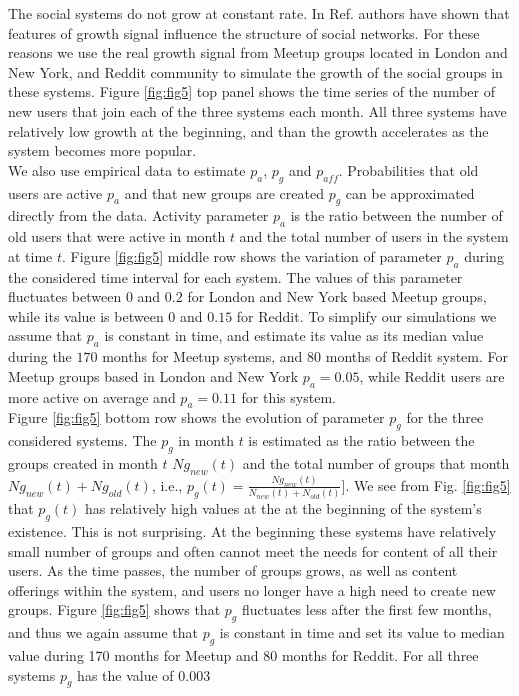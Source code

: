 The social systems do not grow at constant rate. In Ref. \cite{vranic2021growth} authors have shown that features of growth signal influence the  structure of social networks. For these reasons we use the real growth signal from Meetup groups located in London and New York, and Reddit community to simulate the growth of the social groups in these systems. Figure \ref{fig:fig5} top panel shows the time series of the number of new users that join each of the three systems each month. All three systems have relatively low growth at the beginning, and than the growth accelerates as the system becomes more popular.\\ 

We also use empirical data to estimate $p_{a}$, $p_{g}$ and $p_{aff}$. Probabilities that old users are active $p_a$ and that new groups are created $p_g$ can be approximated directly from the data. Activity parameter $p_{a}$ is the ratio between the number of old users that were active in month $t$ and the total number of users in the system at time $t$. Figure \ref{fig:fig5} middle row shows the variation of parameter $p_{a}$ during the considered time interval for each system. The values of this parameter fluctuates between $0$ and $0.2$ for London and New York based Meetup groups, while its value is between $0$ and $0.15$ for Reddit. To simplify our simulations we assume that $p_{a}$ is constant in time, and estimate its value as its median value during the $170$ months for Meetup systems, and $80$ months of Reddit system. For Meetup groups based in London and New York $p_{a}=0.05$, while Reddit users are more active on average and $p_{a}=0.11$ for this system.\\
Figure \ref{fig:fig5} bottom row shows the evolution of parameter $p_{g}$ for the three considered systems. The $p_{g}$ in month $t$ is estimated as the ratio between the groups created in month $t$ $Ng_{new}(t)$ and the total number of groups that month $Ng_{new}(t)+Ng_{old}(t)$, i.e., $p_{g}(t)=\frac{Ng_{new}(t)}{N_{new}(t)+N_{old}(t)}]$. We see from Fig. \ref{fig:fig5} that $p_{g}(t)$ has relatively high values at the at the beginning of the system's existence. This is not surprising. At the beginning these systems have relatively small number of groups and often cannot meet the needs for content of all their users. As the time passes, the number of groups grows, as well as content offerings within the system, and users no longer have a high need to create new groups. Figure \ref{fig:fig5} shows that $p_{g}$ fluctuates less after the first few months, and thus we again assume that $p_{g}$ is constant in time and set its value to median value during 170 months for Meetup and 80 months for Reddit. For all three systems $p_{g}$ has the value of $0.003$\\ 
